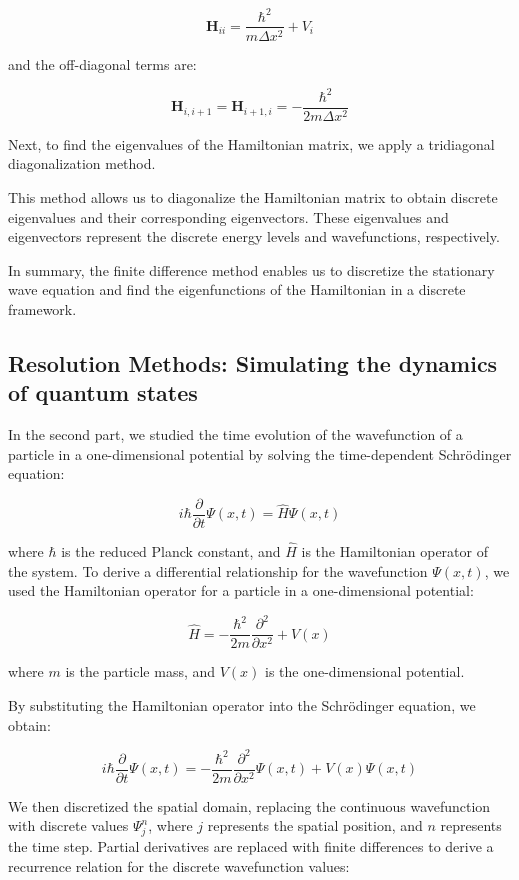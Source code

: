 \documentclass[12pt,french]{article}
\begin{document}
$$\mathbf{H}_{ii} = \frac{\hbar^2}{m\Delta x^2} + V_i$$

and the off-diagonal terms are:

$$\mathbf{H}_{i,i+1} = \mathbf{H}_{i+1,i} = -\frac{\hbar^2}{2m\Delta x^2}$$

Next, to find the eigenvalues of the Hamiltonian matrix, we apply a tridiagonal diagonalization method.

This method allows us to diagonalize the Hamiltonian matrix to obtain discrete eigenvalues and their corresponding eigenvectors. These eigenvalues and eigenvectors represent the discrete energy levels and wavefunctions, respectively.

In summary, the finite difference method enables us to discretize the stationary wave equation and find the eigenfunctions of the Hamiltonian in a discrete framework.

\subsection{Resolution Methods: Simulating the dynamics of quantum states}

In the second part, we studied the time evolution of the wavefunction of a particle in a one-dimensional potential by solving the time-dependent Schrödinger equation:

$$i\hbar\frac{\partial}{\partial t}\Psi(x,t) = \hat{H}\Psi(x,t)$$

where $\hbar$ is the reduced Planck constant, and $\hat{H}$ is the Hamiltonian operator of the system. To derive a differential relationship for the wavefunction $\Psi(x,t)$, we used the Hamiltonian operator for a particle in a one-dimensional potential:

$$\hat{H} = -\frac{\hbar^2}{2m}\frac{\partial^2}{\partial x^2} + V(x)$$

where $m$ is the particle mass, and $V(x)$ is the one-dimensional potential.

By substituting the Hamiltonian operator into the Schrödinger equation, we obtain:

$$i\hbar\frac{\partial}{\partial t}\Psi(x,t) = -\frac{\hbar^2}{2m}\frac{\partial^2}{\partial x^2}\Psi(x,t) + V(x)\Psi(x,t)$$

We then discretized the spatial domain, replacing the continuous wavefunction with discrete values $\Psi_j^n$, where $j$ represents the spatial position, and $n$ represents the time step. Partial derivatives are replaced with finite differences to derive a recurrence relation for the discrete wavefunction values:
\end{document}
